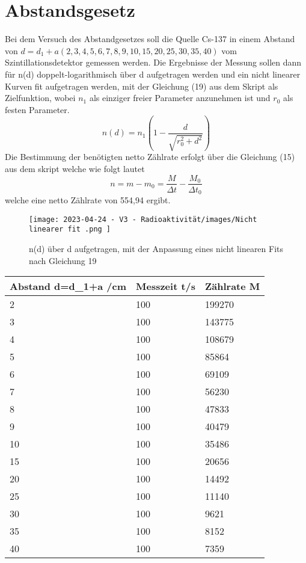 \documentclass[../protokoll.tex]{subfiles}
\begin{document}
\section{Abstandsgesetz}\label{sec:Abstandsgesetz}
Bei dem Versuch des Abstandgesetzes soll die Quelle Cs-137 in einem Abstand von $d=d_1 +a (2,3,4,5,6,7,8,9,10,15,20,25,30,35,40)$ vom Szintillationsdetektor gemessen werden. Die Ergebnisse der Messung sollen dann für n(d) doppelt-logarithmisch über d aufgetragen werden und ein nicht linearer Kurven fit aufgetragen werden, mit der Gleichung (19) aus dem Skript als Zielfunktion, wobei $n_1$ als einziger freier Parameter anzunehmen ist und $r_0$ als festen Parameter. 
\begin{equation}
    n(d)=n_1(1-\frac{d}{\sqrt{r_0^2 + d^2}})
\end{equation}
Die Bestimmung der benötigten netto Zählrate erfolgt über die Gleichung (15) aus dem skript welche wie folgt lautet 
\begin{equation}
    n=m-m_0=\frac{M}{\Delta t}-\frac{M_0}{\Delta t_0}
\end{equation}
welche eine netto Zählrate von 554,94 ergibt.
\begin{figure}[H]
    \centering
    \texttt{[image: 2023-04-24 - V3 - Radioaktivität/images/Nicht linearer fit .png ]}
    \caption{n(d) über d aufgetragen, mit der Anpassung eines nicht linearen Fits nach Gleichung 19}
    \label{Abb.1}
\end{figure}
\begin{table}[H]
\centering
\begin{tabular}{|l|l|l|}
\hline
Abstand d=d\_1+a /cm & Messzeit  t/s & Zählrate  M \\ \hline
2                    & 100           & 199270      \\ \hline
3                    & 100           & 143775      \\ \hline
4                    & 100           & 108679      \\ \hline
5                    & 100           & 85864       \\ \hline
6                    & 100           & 69109       \\ \hline
7                    & 100           & 56230       \\ \hline
8                    & 100           & 47833       \\ \hline
9                    & 100           & 40479       \\ \hline
10                   & 100           & 35486       \\ \hline
15                   & 100           & 20656       \\ \hline
20                   & 100           & 14492       \\ \hline
25                   & 100           & 11140       \\ \hline
30                   & 100           & 9621        \\ \hline
35                   & 100           & 8152        \\ \hline
40                   & 100           & 7359        \\ \hline
\end{tabular}
\end{table}
\end{document}
